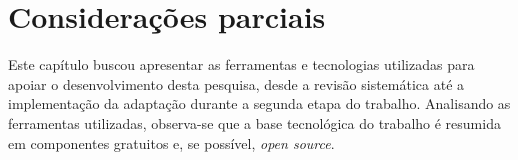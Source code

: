 	
\section{Considerações parciais} %
\label{sec:considerações_parciais}

	Este capítulo buscou apresentar as ferramentas e tecnologias utilizadas para apoiar o desenvolvimento desta pesquisa, desde a revisão sistemática até a implementação da adaptação durante a segunda etapa do trabalho. Analisando as ferramentas utilizadas, observa-se que a base tecnológica do trabalho é resumida em componentes gratuitos e, se possível, \textit{open source}.
	

